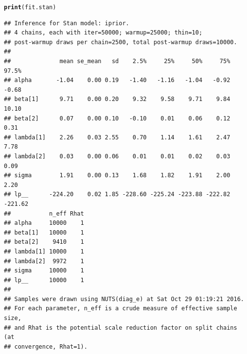 \documentclass{beamer}\usepackage[]{graphicx}\usepackage[]{color}
\makeatletter
\newcommand{\hlstd}[1]{\textcolor[rgb]{0.345,0.345,0.345}{#1}}%
\newcommand{\hlkwd}[1]{\textcolor[rgb]{0.737,0.353,0.396}{\textbf{#1}}}%
\newenvironment{kframe}{%
 \def\at@end@of@kframe{}%
 \ifinner\ifhmode%
  \def\at@end@of@kframe{\end{minipage}}%
  \begin{minipage}{\columnwidth}%
 \fi\fi%
 \def\FrameCommand##1{\hskip\@totalleftmargin \hskip-\fboxsep
 \colorbox{shadecolor}{##1}\hskip-\fboxsep
     \hskip-\linewidth \hskip-\@totalleftmargin \hskip\columnwidth}%
 \MakeFramed {\advance\hsize-\width
   \@totalleftmargin\z@ \linewidth\hsize
   \@setminipage}}%
 {\par\unskip\endMakeFramed%
 \at@end@of@kframe}
\newenvironment{knitrout}{}{} %
\makeatother
\begin{document}
\newsavebox{\stanres}
\begin{lrbox}{\stanres}
\begin{knitrout}\footnotesize
{}\color{fgcolor}\begin{kframe}
\begin{alltt}
\hlkwd{print}\hlstd{(fit.stan)}
\end{alltt}
\begin{verbatim}
## Inference for Stan model: iprior.
## 4 chains, each with iter=50000; warmup=25000; thin=10; 
## post-warmup draws per chain=2500, total post-warmup draws=10000.
## 
##              mean se_mean   sd    2.5%     25%     50%     75%   97.5%
## alpha       -1.04    0.00 0.19   -1.40   -1.16   -1.04   -0.92   -0.68
## beta[1]      9.71    0.00 0.20    9.32    9.58    9.71    9.84   10.10
## beta[2]      0.07    0.00 0.10   -0.10    0.01    0.06    0.12    0.31
## lambda[1]    2.26    0.03 2.55    0.70    1.14    1.61    2.47    7.78
## lambda[2]    0.03    0.00 0.06    0.01    0.01    0.02    0.03    0.09
## sigma        1.91    0.00 0.13    1.68    1.82    1.91    2.00    2.20
## lp__      -224.20    0.02 1.85 -228.60 -225.24 -223.88 -222.82 -221.62
##           n_eff Rhat
## alpha     10000    1
## beta[1]   10000    1
## beta[2]    9410    1
## lambda[1] 10000    1
## lambda[2]  9972    1
## sigma     10000    1
## lp__      10000    1
## 
## Samples were drawn using NUTS(diag_e) at Sat Oct 29 01:19:21 2016.
## For each parameter, n_eff is a crude measure of effective sample size,
## and Rhat is the potential scale reduction factor on split chains (at 
## convergence, Rhat=1).
\end{verbatim}
\end{kframe}
\end{knitrout}
\end{lrbox}
\end{document}
